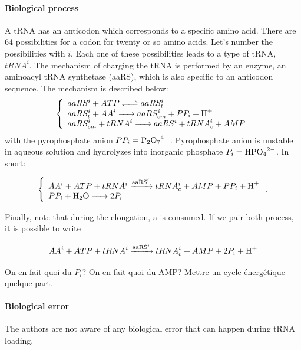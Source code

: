 \paragraph{Biological process} A tRNA has an anticodon which corresponds to a specific amino acid. There are 64 possibilities for a codon for twenty or so amino acids. Let's number the possibilities with $i$. Each one of these possibilities leads to a type of tRNA, $tRNA^i$. The mechanism of charging the tRNA is performed by an enzyme, an aminoacyl tRNA synthetase (aaRS), which is also specific to an anticodon sequence. The mechanism is described below:
$$
  \left\{
    \begin{array}{l}
      \reactionRev{aaRS^i + ATP}{aaRS^i_t}{}{} \\
      \reactionIrr{aaRS^i_t + AA^i}{aaRS^i_{cm}+PP_i+\ce{H+}}{}{} \\
      \reactionIrr{aaRS^i_{cm} + tRNA^i}{aaRS^i + tRNA^i_c + AMP}{}{} \\
    \end{array}
  \right.
$$
with the pyrophosphate anion $PP_i=\ce{P2O7^4-}$. Pyrophosphate anion is unstable in aqueous solution and hydrolyzes into inorganic phosphate $P_i=\ce{HPO4^2-}$. In short:
\begin{mdframed}[style=MyFrame]
$$
  \left\{
    \begin{array}{l}
    \reactionIrr{AA^i+ATP+tRNA^i}{tRNA^i_c+AMP+PP_i+\ce{H+}}{aaRS^i}{} \\
    \reactionIrr{PP_i + \ce{H2O}}{2P_i}{}{} \\
  \end{array}
  \right. .
$$
\end{mdframed}
Finally, note that during the elongation, a  is consumed. If we pair both process, it is possible to write
\begin{mdframed}[style=MyFrame]
$$
  \reactionIrr{AA^i+ATP+tRNA^i}{tRNA^i_c+AMP+2P_i+\ce{H+}}{aaRS^i}{} \\
$$
\end{mdframed}
\textcolor[rgb]{1.00,0.00,0.00}{On en fait quoi du $P_i$?}
\textcolor[rgb]{1.00,0.00,0.00}{On en fait quoi du AMP? Mettre un cycle énergétique quelque part.}


\paragraph{Biological error} The authors are not aware of any biological error that can happen during tRNA loading.




